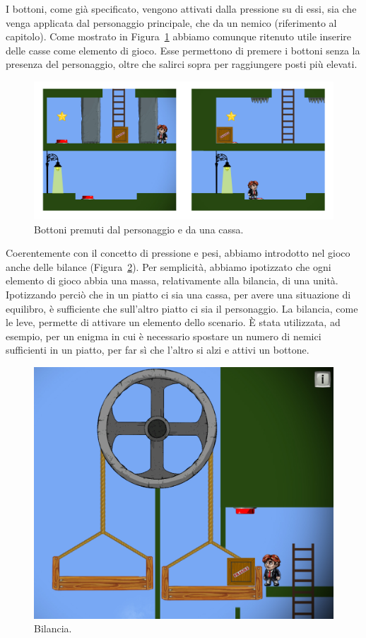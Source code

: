 I bottoni, come già specificato, vengono attivati dalla pressione su di essi, sia che venga applicata dal personaggio principale, che da un nemico (riferimento al capitolo). Come mostrato in Figura~\ref{fig:platform_bottoni} abbiamo comunque ritenuto utile inserire delle casse come elemento di gioco. Esse permettono di premere i bottoni senza la presenza del personaggio, oltre che salirci sopra per raggiungere posti più elevati.

\begin{figure}%
	\centering
	\includegraphics[width= \columnwidth]{images/gameDesign/10.jpg}
	\caption{Bottoni premuti dal personaggio e da una cassa.}
	\label{fig:platform_bottoni}
\end{figure}

Coerentemente con il concetto di pressione e pesi, abbiamo introdotto nel gioco anche delle bilance (Figura~\ref{fig:platform_bilancia}). Per semplicità, abbiamo ipotizzato che ogni elemento di gioco abbia una massa, relativamente alla bilancia, di una unità. Ipotizzando perciò che in un piatto ci sia una cassa, per avere una situazione di equilibro, è sufficiente che sull’altro piatto ci sia il personaggio. La bilancia, come le leve, permette di attivare un elemento dello scenario. È stata utilizzata, ad esempio, per un enigma in cui è necessario spostare un numero di nemici sufficienti in un piatto, per far sì che l’altro si alzi e attivi un bottone.

\begin{figure}%
	\centering
	\includegraphics[width= 0.5\columnwidth]{images/gameDesign/11.jpg}
	\caption{Bilancia.}
	\label{fig:platform_bilancia}
\end{figure}

